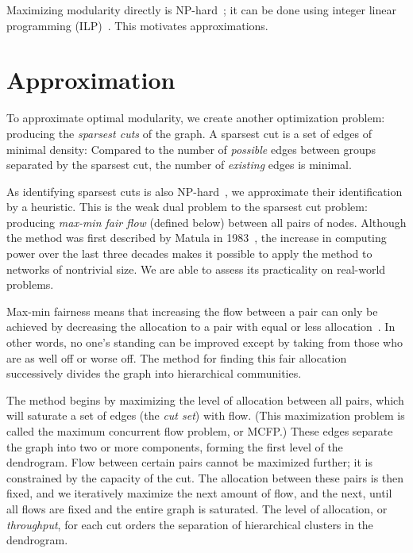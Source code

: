 Maximizing modularity directly is NP-hard~\cite{brandes2006maximizing}; it can be done using integer linear programming (ILP)~\cite{brandes2007finding}. This motivates approximations. 



\section{Approximation}

To approximate optimal modularity, we create another optimization problem: 
producing the \emph{sparsest cuts} of the graph. A sparsest cut is a set of edges of minimal density: Compared to the number of \emph{possible} edges between groups separated by the sparsest cut, the number of \emph{existing} edges is minimal. 

As identifying sparsest cuts is also NP-hard~\cite{matula1990sparsest}, we approximate their identification by a heuristic. This is the weak dual problem to the sparsest cut problem: producing \emph{max-min fair flow} (defined below) between all pairs of nodes. Although the method was first described by Matula in 1983~\cite{matula1983cluster}, the increase in computing power over the last three decades makes it possible to apply the method to networks of nontrivial size. We are able to assess its practicality on real-world problems.

Max-min fairness means that increasing the flow between a pair can only be achieved by decreasing the allocation to a pair with equal or less allocation~\cite{le2005rate}. In other words, no one's standing can be improved except by taking from those who are as well off or worse off. The method for finding this fair allocation successively divides the graph into hierarchical communities.

The method begins by maximizing the level of allocation between all pairs, which will saturate a set of edges (the \emph{cut set}) with flow. (This maximization problem is called the maximum concurrent flow problem, or MCFP.) These edges separate the graph into two or more components, forming the first level of the dendrogram. Flow between certain pairs cannot be maximized further; it is constrained by the capacity of the cut. The allocation between these pairs is then fixed, and we iteratively maximize the next amount of flow, and the next, until all flows are fixed and the entire graph is saturated. The level of allocation, or \emph{throughput}, for each cut orders the separation of hierarchical clusters in the dendrogram. 

